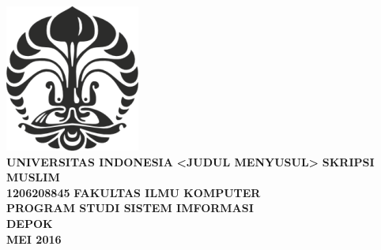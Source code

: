 \documentclass[]{article}
\begin{document}
\begin{spacing}{1.5}


\begin{titlepage}
\begin{center}    
\includegraphics{logo_UI_hitam.png}\\
\uppercase{\textbf{universitas indonesia}}
\vfill
\uppercase{\textbf{<judul menyusul>}}
\vfill
\uppercase{\textbf{skripsi}}
\vfill
\uppercase{\textbf{Muslim}}\\
\uppercase{\textbf{1206208845}}
\vfill
\uppercase{\textbf{fakultas ilmu komputer}}\\
\uppercase{\textbf{program studi sistem imformasi}}\\
\uppercase{\textbf{depok}}\\
\uppercase{\textbf{mei 2016}}\\
\end{center}
\end{titlepage}

\end{spacing}
\end{document}
